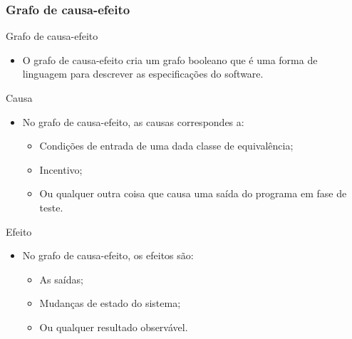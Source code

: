 \begin{frame}[hasprev=true, hasnext=true]
\frametitle{Grafo de causa-efeito}

\begin{block:fact}{Grafo de causa-efeito}
\begin{itemize}
	\item O grafo de causa-efeito cria um grafo booleano que é uma forma
	de linguagem para descrever as especificações do software.
\end{itemize}
\end{block:fact}


\begin{block:fact}{Causa}
\begin{itemize}
	\item No grafo de causa-efeito, as causas correspondes a:
	\begin{itemize}
		\item Condições de entrada de uma dada classe de equivalência;
		\item Incentivo;
		\item Ou qualquer outra coisa que causa uma saída do programa em fase de teste.
	\end{itemize}
\end{itemize}
\end{block:fact}


\begin{block:fact}{Efeito}
\begin{itemize}
	\item No grafo de causa-efeito, os efeitos são:
	\begin{itemize}
		\item As saídas;
		\item Mudanças de estado do sistema;
		\item Ou qualquer resultado observável.
	\end{itemize}
\end{itemize}
\end{block:fact}
\end{frame}



